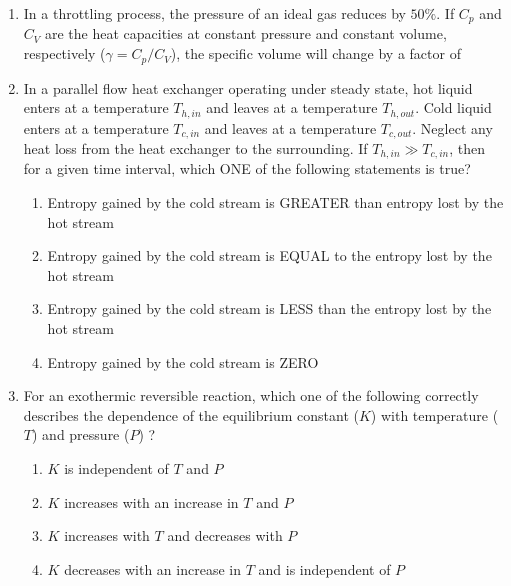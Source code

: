 \documentclass[journal,12pt,onecolumn]{IEEEtran}
\theoremstyle{remark}
\begin{document}
\begin{enumerate}
\item In a throttling process, the pressure of an ideal gas reduces by $50\%$. If $C_p$ and $C_V$ are the heat capacities at constant pressure and constant volume, respectively ($\gamma = C_p/C_V$), the specific volume will change by a factor of
\hfill{}
\begin{enumerate}
\end{enumerate}

\item In a parallel flow heat exchanger operating under steady state, hot liquid enters at a temperature $T_{h,in}$ and leaves at a temperature $T_{h,out}$. Cold liquid enters at a temperature $T_{c,in}$ and leaves at a temperature $T_{c,out}$. Neglect any heat loss from the heat exchanger to the surrounding. If $T_{h,in} \gg T_{c,in}$, then for a given time interval, which ONE of the following statements is true?
\hfill{}
\begin{enumerate}
\item Entropy gained by the cold stream is GREATER than entropy lost by the hot stream 
\item Entropy gained by the cold stream is EQUAL to the entropy lost by the hot stream 
\item Entropy gained by the cold stream is LESS than the entropy lost by the hot stream
\item Entropy gained by the cold stream is ZERO
\end{enumerate}

\item For an exothermic reversible reaction, which one of the following correctly describes the dependence of the equilibrium constant ($K$) with temperature ($T$) and pressure ($P$) ?
\hfill{}
\begin{enumerate}
\item $K$ is independent of $T$ and $P$
\item $K$ increases with an increase in $T$ and $P$
\item $K$ increases with $T$ and decreases with $P$
\item $K$ decreases with an increase in $T$ and is independent of $P$
\end{enumerate}


\end{enumerate}
\end{document}
